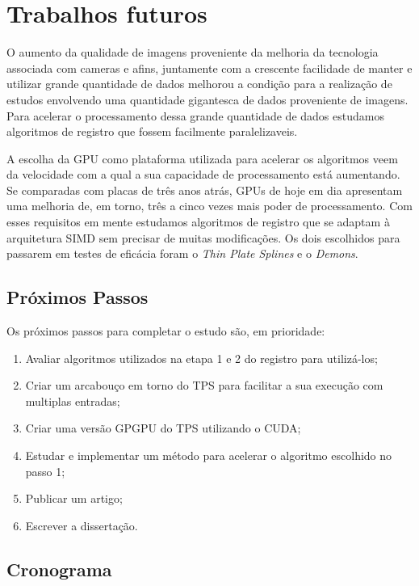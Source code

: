 \chapter{Trabalhos futuros}
\label{cap:conclusoes}

	O aumento da qualidade de imagens proveniente da melhoria da tecnologia associada com cameras e afins, juntamente com
a crescente facilidade de manter e utilizar grande quantidade de dados melhorou a condição para a realização de estudos
envolvendo uma quantidade gigantesca de dados proveniente de imagens. Para acelerar o processamento dessa
grande quantidade de dados estudamos algoritmos de registro que fossem facilmente paralelizaveis.

	A escolha da GPU como plataforma utilizada para acelerar os algoritmos veem da velocidade com a qual a sua capacidade
de processamento está aumentando. Se comparadas com placas de três anos atrás, GPUs de hoje em dia apresentam uma melhoria
de, em torno, três a cinco vezes mais poder de processamento. Com esses requisitos em mente estudamos algoritmos de registro
que se adaptam à arquitetura SIMD sem precisar de muitas modificações. Os dois escolhidos para passarem em testes de
eficácia foram o \textit{Thin Plate Splines} e o \textit{Demons}.
\section{Próximos Passos} 

	Os próximos passos para completar o estudo são, em prioridade:
\begin{enumerate}
	\item Avaliar algoritmos utilizados na etapa 1 e 2 do registro para utilizá-los;
	\item Criar um arcabouço em torno do TPS para facilitar a sua execução com multiplas entradas;
	\item Criar uma versão GPGPU do TPS utilizando o CUDA;
	\item Estudar e implementar um método para acelerar o algoritmo escolhido no passo 1;
	\item Publicar um artigo;
	\item Escrever a dissertação.
\end{enumerate}

\section{Cronograma}

